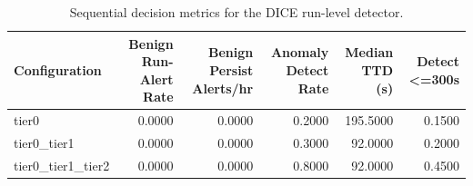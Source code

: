 \begin{table}[t]
\centering
\caption{Sequential decision metrics for the DICE run-level detector.}
\label{tab:dice_sequential_metrics}
\footnotesize
\begin{tabular}{lrrrrr}
\toprule
Configuration & Benign Run-Alert Rate & Benign Persist Alerts/hr & Anomaly Detect Rate & Median TTD (s) & Detect <=300s \\
\midrule
tier0 & 0.0000 & 0.0000 & 0.2000 & 195.5000 & 0.1500 \\
tier0_tier1 & 0.0000 & 0.0000 & 0.3000 & 92.0000 & 0.2000 \\
tier0_tier1_tier2 & 0.0000 & 0.0000 & 0.8000 & 92.0000 & 0.4500 \\
\bottomrule
\end{tabular}

\end{table}
